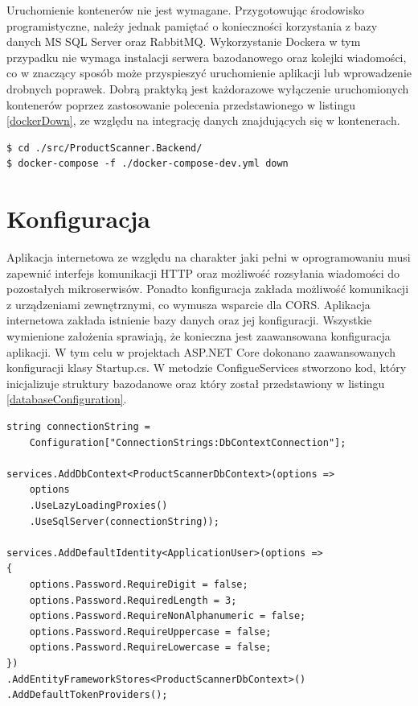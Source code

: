 Uruchomienie kontenerów nie jest wymagane. Przygotowując środowisko programistyczne, należy jednak pamiętać o konieczności korzystania z bazy danych MS SQL Server oraz RabbitMQ. Wykorzystanie Dockera w tym przypadku nie wymaga instalacji serwera bazodanowego oraz kolejki wiadomości, co w znaczący sposób może przyspieszyć uruchomienie aplikacji lub wprowadzenie drobnych poprawek. Dobrą praktyką jest każdorazowe wyłączenie uruchomionych kontenerów poprzez zastosowanie polecenia przedstawionego w listingu \ref{dockerDown}, ze względu na integrację danych znajdujących się w kontenerach. 


\begin{lstlisting}[caption={Komenda docker-compose down.},label={dockerDown} ]
$ cd ./src/ProductScanner.Backend/
$ docker-compose -f ./docker-compose-dev.yml down
\end{lstlisting}


\section{Konfiguracja}

Aplikacja internetowa ze względu na charakter jaki pełni w oprogramowaniu musi zapewnić interfejs komunikacji HTTP oraz możliwość rozsyłania wiadomości do pozostałych mikroserwisów. Ponadto konfiguracja zakłada możliwość komunikacji z urządzeniami zewnętrznymi, co wymusza wsparcie dla CORS. Aplikacja internetowa zakłada istnienie bazy danych oraz jej konfiguracji. Wszystkie wymienione założenia sprawiają, że konieczna jest zaawansowana konfiguracja aplikacji. W tym celu w projektach ASP.NET Core dokonano zaawansowanych konfiguracji klasy Startup.cs. W metodzie ConfigueServices stworzono kod, który inicjalizuje struktury bazodanowe oraz który został przedstawiony w listingu \ref{databaseConfiguration}. 

\begin{lstlisting}[caption={Konfiguracja bazy danych oraz obiektu komunikacji bazodanowej.},label={databaseConfiguration} ]
string connectionString = 
	Configuration["ConnectionStrings:DbContextConnection"];
	
services.AddDbContext<ProductScannerDbContext>(options =>
	options
	.UseLazyLoadingProxies()
	.UseSqlServer(connectionString));

services.AddDefaultIdentity<ApplicationUser>(options =>
{
	options.Password.RequireDigit = false;
	options.Password.RequiredLength = 3;
	options.Password.RequireNonAlphanumeric = false;
	options.Password.RequireUppercase = false;
	options.Password.RequireLowercase = false;
})
.AddEntityFrameworkStores<ProductScannerDbContext>()
.AddDefaultTokenProviders();
\end{lstlisting}


